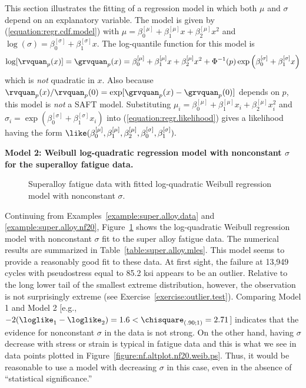 This section illustrates the fitting of a regression model in which both
$\mu$ and $\sigma$ depend on an explanatory variable. The model is given
by (\ref{equation:regr.cdf.model}) with
$\mu=\beta_{0}^{[\mu]}+\beta_{1}^{[\mu]} x+\beta_{2}^{[\mu]}
x^2$ and $\log(\sigma)=\beta_{0}^{[\sigma]}+\beta_{1}^{[\sigma]} x$.
The log-quantile function for this model is
\begin{equation}
\label{equation:quad.mu.lin.sigma.model}
	\log[\rvquan_{p}(x)] = \grvquan_{p}(x)=\beta_{0}^{[\mu]}+\beta_{1}^{[\mu]} x +
\beta_{2}^{[\mu]} x^2 +
\Phi^{-1}(p)\exp \left( \beta_{0}^{[\sigma]}+ \beta_{1}^{[\sigma]} x
\right )
\end{equation}
which is {\em not} quadratic in $x$. Also because
$\rvquan_{p}(x)/\rvquan_{p}(0)=\exp[\grvquan_{p}(x)-\grvquan_{p}(0)]$
depends on $p$, this model is {\em not} a SAFT model.
Substituting $\mu_{i}=\beta_{0}^{[\mu]}+
\beta_{1}^{[\mu]} x_{i}+\beta_{2}^{[\mu]} x_{i}^{2}$
and $\sigma_{i}=\exp \left (\beta_{0}^{[\sigma]}+\beta_{1}^{[\sigma]}
x_{i}
\right )$ into (\ref{equation:regr.likelihood}) 
gives a likelihood having the form
$\like(\beta_{0}^{[\mu]},\beta_{1}^{[\mu]},\beta_{2}^{[\mu]},
\beta_{0}^{[\sigma]},\beta_{1}^{[\sigma]}).$

\begin{example}
{\bf Model 2: Weibull log-quadratic
regression model with nonconstant $\sigma$ for the superalloy fatigue data.} 
\label{example:super.alloy.nf21}
\begin{figure}
\caption{Superalloy fatigue 
data with fitted log-quadratic Weibull regression model
with nonconstant $\sigma$.}
\label{figure:nf.altplot.nf21.weib.ps}
\end{figure}
Continuing from Examples~\ref{example:super.alloy.data} and
\ref{example:super.alloy.nf20},
Figure~\ref{figure:nf.altplot.nf21.weib.ps} shows the log-quadratic
Weibull regression model with nonconstant $\sigma$ fit to the super
alloy fatigue data.  The numerical results are summarized in
Table~\ref{table:super.alloy.mles}.  This model seems to provide a
reasonably good fit to these data. At first sight, the failure at 
13,949 cycles with
pseudostress equal to 85.2 ksi appears to be an outlier.  Relative to the
long lower tail of the smallest extreme distribution, however, the
observation is not surprisingly extreme (see
Exercise~\ref{exercise:outlier.test}).
Comparing Model 1 and Model 2 [e.g.,
$-2(\loglike_{1}-\loglike_{2})=1.6 < \chisquare_{(.90;1)} = 2.71$]
indicates that the evidence for nonconstant $\sigma$ in the data is
not strong. On the other hand, having $\sigma$ decrease with stress
or strain is typical in fatigue data and this is what we see in data
points plotted in Figure~\ref{figure:nf.altplot.nf20.weib.ps}.
Thus, it would be reasonable to use a model with decreasing $\sigma$
in this case, even
in the absence of ``statistical significance.''
\end{example}

